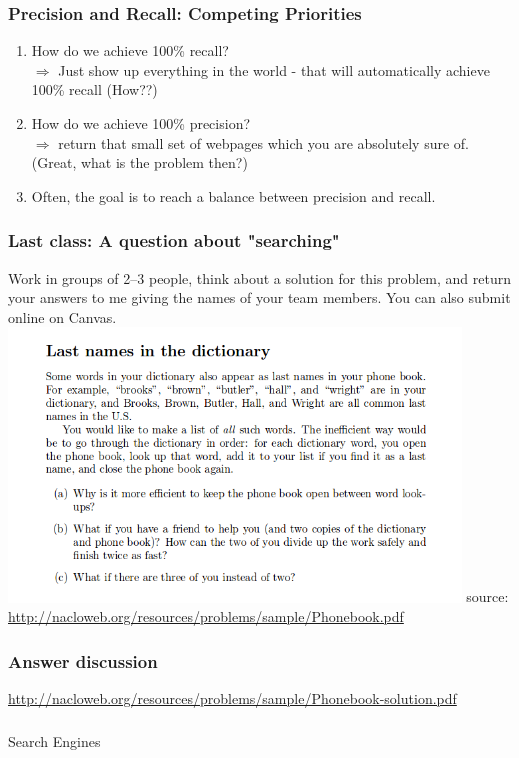 \documentclass{beamer}
\begin{document}
\begin{frame}
\frametitle{Precision and Recall: Competing Priorities}%
\begin{enumerate}
\item How do we achieve 100\% recall? \pause
\\ $\Rightarrow$ Just show up everything in the world - that will automatically achieve 100\% recall (How??) \pause
\item How do we achieve 100\% precision? \pause
\\ $\Rightarrow$ return that small set of webpages which you are absolutely sure of. (Great, what is the problem then?) \pause
\item Often, the goal is to reach a balance between precision and recall. 
\end{enumerate}
\end{frame}

\begin{frame} %
\frametitle{Last class: A question about "searching"}
Work in groups of 2--3 people, think about a solution for this problem, and return your answers to me giving the names of your team members. You can also submit online on Canvas. 
\includegraphics[width=0.9\textwidth]{18Sep-120Exercise.png}
\tiny source: \url{http://nacloweb.org/resources/problems/sample/Phonebook.pdf}
\end{frame}

\begin{frame} %
\frametitle{Answer discussion}
\url{http://nacloweb.org/resources/problems/sample/Phonebook-solution.pdf}
\end{frame}

\begin{frame}
\frametitle{}
\begin{center}
\Large Search Engines
\end{center}
\end{frame}
\end{document}
